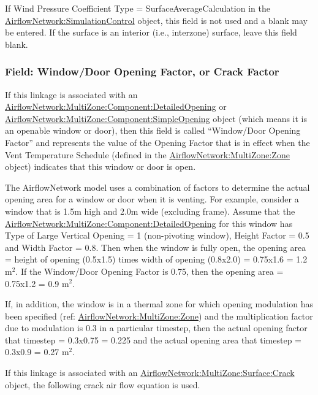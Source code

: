 If Wind Pressure Coefficient Type = SurfaceAverageCalculation in the \hyperref[airflownetworksimulationcontrol]{AirflowNetwork:\hyperref[simulationcontrol]{SimulationControl}}
object, this field is not used and a blank may be entered. If the surface is an
interior (i.e., interzone) surface, leave this field blank.

\subsubsection{Field: Window/Door Opening Factor, or Crack Factor}\label{field-windowdoor-opening-factor-or-crack-factor}

If this linkage is associated with an \hyperref[airflownetworkmultizonecomponentdetailedopening]{AirflowNetwork:MultiZone:Component:DetailedOpening} or \hyperref[airflownetworkmultizonecomponentsimpleopening]{AirflowNetwork:MultiZone:Component:SimpleOpening} object (which means it is an openable window or door), then this field is called ``Window/Door Opening Factor'' and represents the value of the Opening Factor that is in effect when the Vent Temperature Schedule (defined in the \hyperref[airflownetworkmultizonezone]{AirflowNetwork:MultiZone:Zone} object) indicates that this window or door is open.

The AirflowNetwork model uses a combination of factors to determine the actual opening area for a window or door when it is venting. For example, consider a window that is 1.5m high and 2.0m wide (excluding frame). Assume that the \hyperref[airflownetworkmultizonecomponentdetailedopening]{AirflowNetwork:MultiZone:Component:DetailedOpening} for this window has Type of Large Vertical Opening = 1 (non-pivoting window), Height Factor = 0.5 and Width Factor = 0.8. Then when the window is fully open, the opening area = height of opening (0.5x1.5) times width of opening (0.8x2.0) = 0.75x1.6 = 1.2 m\(^{2}\). If the Window/Door Opening Factor is 0.75, then the opening area = 0.75x1.2 = 0.9 m\(^{2}\).

If, in addition, the window is in a thermal zone for which opening modulation has been specified (ref: \hyperref[airflownetworkmultizonezone]{AirflowNetwork:MultiZone:Zone}) and the multiplication factor due to modulation is 0.3 in a particular timestep, then the actual opening factor that timestep = 0.3x0.75 = 0.225 and the actual opening area that timestep = 0.3x0.9 = 0.27 m\(^{2}\).

If this linkage is associated with an \hyperref[airflownetworkmultizonesurfacecrack]{AirflowNetwork:MultiZone:Surface:Crack} object, the following crack air flow equation is used.

